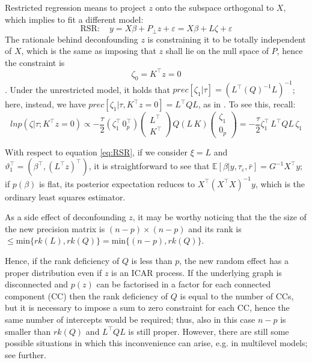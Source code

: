\documentclass[openany]{book}
\begin{document}
Restricted regression means to project $z$ onto the subspace orthogonal to $X$, which implies to fit a different model:
\begin{equation} \label{eq:RSR}
\text{RSR}: \quad y = X \beta + P_{\bot}z + \varepsilon = X \beta + L \zeta + \varepsilon
\end{equation}
The rationale behind deconfounding $z$ is constraining it to be totally independent of $X$, which is the same as imposing that $z$ shall lie on the null space of $P$, hence the constraint is $$ \zeta_0 = K^{\top}z = 0$$. Under the unrestricted model, it holds that $prec[\zeta_1 | \tau] = (L^{\top}(Q)^{-1}L)^{-1}$; here, instead, we have $prec[\zeta_1 | \tau, K^{\top}z = 0] = L^{\top}QL$, as in \citep[eq. 16-17 at p. 1201][]{RHZ}. To see this, recall:
$$
ln p(\zeta | \tau; K^{\top}z = 0) \propto 
 -\dfrac{\tau}{2}  (\zeta_1^{\top} \, 0_{p}^{\top}) \begin{pmatrix} L^{\top} \\ K^{\top}\end{pmatrix} 
Q (L \, K)  \begin{pmatrix} \zeta_1 \\ 0_{p} \end{pmatrix} = -\dfrac{\tau}{2} \zeta_1^{\top} \, L^{\top}QL \, \zeta_1
$$


With respect to equation \ref{eq:RSR}, if we consider $\xi = L$ and $\vartheta_1^{\top} = (\beta^{\top}, (L^{\top}z)^{\top})$, it is straightforward to see that $\mathbb{E}[\beta|y, \tau_{\varepsilon}, \bar{r}] = G^{-1} X^{\top}y$; if $p(\beta)$ is flat, its posterior expectation reduces to $X^{\top}(X^{\top}X)^{-1}y$, which is the ordinary least squares estimator.

As a side effect of deconfounding $z$, it may be worthy noticing that the the size of the new precision matrix is $(n-p) \times (n-p)$ and its rank is $ \leq \mathrm{min} \lbrace rk(L), rk(Q) \rbrace = \mathrm{min} \lbrace (n-p), rk(Q) \rbrace$. 

Hence, if the rank deficiency of $Q$ is less than $p$, the new random effect has a proper distribution even if $z$ is an ICAR process. If the underlying graph is disconnected and $p(z)$ can be factorised in a factor for each connected component (CC) then the rank deficiency of $Q$ is equal to the number of CCs, but it is necessary to impose a sum to zero constraint for each CC, hence the same number of intercepts would be required; thus, also in this case $n-p$ is smaller than $rk(Q)$ and $L^{\top}QL$ is still proper.
However, there are still some possible situations in which this inconvenience can arise, e.g. in multilevel models; see further.
\end{document}
